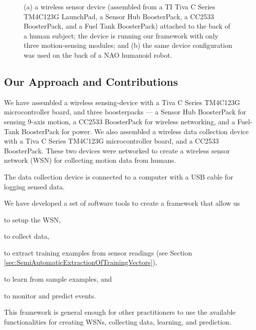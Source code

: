 \documentclass[]{IEEEtran}
\begin{document}
\begin{figure}[htb]
\centering
{}
\qquad
{} 
\caption{(a) a wireless sensor device (assembled from a TI Tiva C Series  TM4C123G LaunchPad, a Sensor Hub BoosterPack, a CC2533 BoosterPack, and a Fuel Tank BoosterPack) attached to the back of a human subject; the device is running our framework  with only three motion-sensing modules; and (b) the 
same device configuration was used on the back of a NAO humanoid robot\cite{abeyruwanFlairs2015}.}
 \label{fig:deviceWithSubjects}
\end{figure}

\subsection{Our Approach and Contributions}

We have assembled a wireless sensing-device with a Tiva C Series TM4C123G microcontroller board, and three 
boosterpacks --- a
Sensor Hub BoosterPack  for sensing 9-axis motion,  a CC2533  BoosterPack for wireless 
networking, and a Fuel-Tank BoosterPack for power. We also assembled a wireless data collection device with a Tiva C Series TM4C123G microcontroller board, and a  CC2533  BoosterPack. These two devices were networked to create a wireless sensor network (WSN) for 
collecting motion data from  humans.

The data collection device is connected to a computer with a USB cable for logging sensed data.   

We have developed a set of software tools to create a framework that allow us
\begin{inparaenum}[($i$)] \item  to setup the WSN, \item to collect data, \item to extract training examples from sensor readings (see Section \ref{sec:SemiAutomaticExtractionOfTrainingVectors}), \item to learn from sample examples, and \item 
to monitor and predict events. \end{inparaenum} This framework is general enough for other practitioners to use the
available functionalities for creating WSNs, collecting data, learning, and prediction.
\end{document}
